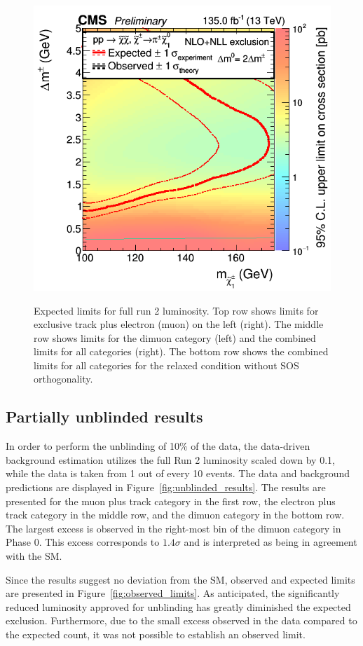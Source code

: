 \begin{figure}[!htb]
\includegraphics[width=0.48\linewidth]{plots/limits/expected/PureHiggsino_SoftPromptRun2Inc_ExpectedXSEC.png} \\

\caption[Expected limits for full run 2 luminosity]{Expected limits for full run 2 luminosity. Top row shows limits for exclusive track plus electron (muon) on the left (right). The middle row shows limits for the dimuon category (left) and the combined limits for all categories (right). The bottom row shows the combined limits for all categories for the relaxed condition without SOS orthogonality.}
\label{fig:expected_limits}
\end{figure}

\subsection{Partially unblinded results}
\label{sec:unblinded-limits}

In order to perform the unblinding of 10\% of the data, the data-driven background estimation utilizes the full Run 2 luminosity scaled down by 0.1, while the data is taken from 1 out of every 10 events. The data and background predictions are displayed in Figure~\ref{fig:unblinded_results}. The results are presented for the muon plus track category in the first row, the electron plus track category in the middle row, and the dimuon category in the bottom row. The largest excess is observed in the right-most bin of the dimuon category in Phase 0. This excess corresponds to $1.4\sigma$ and is interpreted as being in agreement with the SM.

Since the results suggest no deviation from the SM, observed and expected limits are presented in Figure~\ref{fig:observed_limits}. As anticipated, the significantly reduced luminosity approved for unblinding has greatly diminished the expected exclusion. Furthermore, due to the small excess observed in the data compared to the expected count, it was not possible to establish an observed limit.

